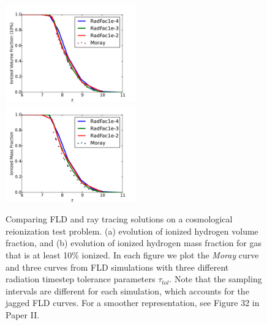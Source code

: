 \begin{figure}[t]
\centerline{\hfill
  \includegraphics[width=0.5\textwidth]{compareIonized_vs_Redshift_10.pdf}
  \includegraphics[width=0.5\textwidth]{compare_mw_Ionized_vs_Redshift.pdf}
  \hfill}
  \caption{Comparing FLD and ray tracing solutions on a cosmological reionization test problem. (a) evolution of ionized hydrogen volume fraction, and (b) evolution of ionized hydrogen mass fraction for gas that is at least 10\% ionized. In each figure we plot the {\em Moray} curve and three curves from FLD simulations with three different radiation timestep tolerance parameters $\tau_{tol}$. Note that the sampling intervals are different for each simulation, which accounts for the jagged FLD curves. For a smoother representation, see Figure 32 in Paper II.}
  \label{fig:ionization_evolution}
\end{figure}

